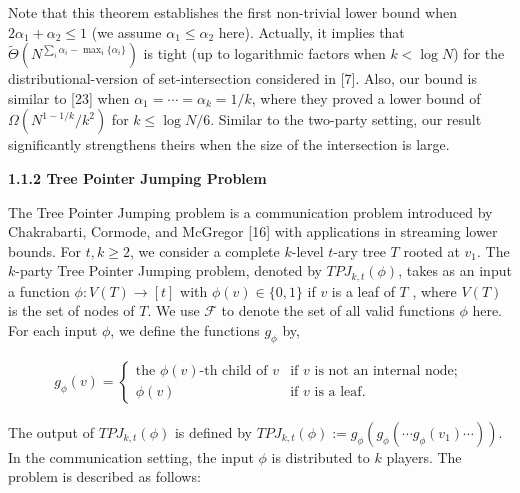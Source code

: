 


Note that this theorem establishes the first non-trivial lower bound when $2\alpha_{1}+\alpha_{2}\leq 1$ (we assume $\alpha_{1}\leq\alpha_{2}$ here). Actually, it implies that $\widetilde{\Theta}\left(N^{\sum_{i}\alpha_{i}-\mathop{\max}_{i}\{\alpha_{i}\}}\right)$ is tight (up to logarithmic factors when $k<\log N$) for the distributional-version of set-intersection considered in [7]. Also, our bound is similar to [23] when $\alpha_{1}=\cdots=\alpha_{k}=1/k$, where they proved a lower bound of $\Omega(N^{1-1/k}/k^{2})$ for $k\leq\log N/6.$ Similar to the two-party setting, our result significantly strengthens theirs when the size of the intersection is large.\par





\par\medskip\noindent\textbf{
1.1.2 Tree Pointer Jumping Problem}\par




The Tree Pointer Jumping problem is a communication problem introduced by Chakrabarti, Cormode, and McGregor [16] with applications in streaming lower bounds. For $t,k\geq 2$, we consider a complete $k$-level $t$-ary tree $T$ rooted at $v_{1}$. The $k$-party Tree Pointer Jumping problem, denoted by $\textit{TPJ}_{k,t}(\phi)$, takes as an input a function $\phi:V(T)\rightarrow[t]$ with $\phi(v)\in\{0,1\}$ if $v$ is a leaf of $T$ , where $V(T)$ is the set of nodes of $T$. We use $\mathcal{F}$ to denote the set of all valid functions $\phi$ here. For each input $\phi$, we define the functions $g_{\phi}$ by,\par


\[\begin{gathered}
g_{\phi}(v)=\begin{cases}\text{the $\phi(v)$-th child of $v$}&\text{if $v$ is not an internal node};\\
\phi(v)&\text{if $v$ is a leaf}.\end{cases}
\end{gathered}\]




The output of $TPJ_{k,t}(\phi)$ is defined by $TPJ_{k,t}(\phi):=g_{\phi}(g_{\phi}(\cdots g_{\phi}(v_{1})\cdots)).$ In the communication setting, the input $\phi$ is distributed to $k$ players. The problem is described as follows:\par




